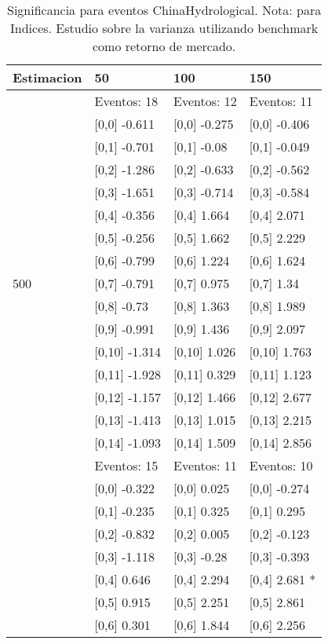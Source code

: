 \begin{table}

\caption{Significancia para eventos ChinaHydrological. Nota: para Indices. Estudio sobre la varianza utilizando benchmark como retorno de mercado.}
\centering
\begin{tabular}[t]{llll}
\toprule
Estimacion & 50 & 100 & 150\\
\midrule
 & Eventos:  18 & Eventos:  12 & Eventos:  11\\
 & {}[0,0] -0.611 & {}[0,0] -0.275 & {}[0,0] -0.406\\
 & {}[0,1] -0.701 & {}[0,1] -0.08 & {}[0,1] -0.049\\
 & {}[0,2] -1.286 & {}[0,2] -0.633 & {}[0,2] -0.562\\
 & {}[0,3] -1.651 & {}[0,3] -0.714 & {}[0,3] -0.584\\
\addlinespace
 & {}[0,4] -0.356 & {}[0,4] 1.664 & {}[0,4] 2.071\\
 & {}[0,5] -0.256 & {}[0,5] 1.662 & {}[0,5] 2.229\\
 & {}[0,6] -0.799 & {}[0,6] 1.224 & {}[0,6] 1.624\\
500 & {}[0,7] -0.791 & {}[0,7] 0.975 & {}[0,7] 1.34\\
 & {}[0,8] -0.73 & {}[0,8] 1.363 & {}[0,8] 1.989\\
\addlinespace
 & {}[0,9] -0.991 & {}[0,9] 1.436 & {}[0,9] 2.097\\
 & {}[0,10] -1.314 & {}[0,10] 1.026 & {}[0,10] 1.763\\
 & {}[0,11] -1.928 & {}[0,11] 0.329 & {}[0,11] 1.123\\
 & {}[0,12] -1.157 & {}[0,12] 1.466 & {}[0,12] 2.677\\
 & {}[0,13] -1.413 & {}[0,13] 1.015 & {}[0,13] 2.215\\
\addlinespace
 & {}[0,14] -1.093 & {}[0,14] 1.509 & {}[0,14] 2.856\\
 & Eventos:  15 & Eventos:  11 & Eventos:  10\\
 & {}[0,0] -0.322 & {}[0,0] 0.025 & {}[0,0] -0.274\\
 & {}[0,1] -0.235 & {}[0,1] 0.325 & {}[0,1] 0.295\\
 & {}[0,2] -0.832 & {}[0,2] 0.005 & {}[0,2] -0.123\\
\addlinespace
 & {}[0,3] -1.118 & {}[0,3] -0.28 & {}[0,3] -0.393\\
 & {}[0,4] 0.646 & {}[0,4] 2.294 & {}[0,4] 2.681 *\\
 & {}[0,5] 0.915 & {}[0,5] 2.251 & {}[0,5] 2.861\\
 & {}[0,6] 0.301 & {}[0,6] 1.844 & {}[0,6] 2.256\\

\end{tabular}
\end{table}
